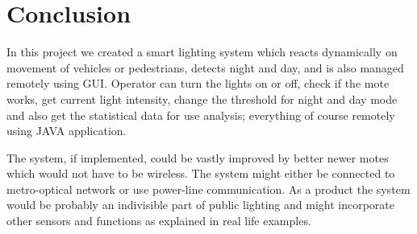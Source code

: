 \documentclass[UKenglish,10pt,a4paper]{report}
\let\openright=\clearpage
\begin{document}
\chapter{Conclusion}
In this project we created a smart lighting system which reacts dynamically on movement of vehicles or pedestrians, detects night and day, and is also managed remotely using GUI. Operator can turn the lights on or off, check if the mote works, get current light intensity, change the threshold for night and day mode and also get the statistical data for use analysis; everything of course remotely using JAVA application.

The system, if implemented, could be vastly improved by better newer motes which would not have to be wireless. The system might either be connected to metro-optical network or use power-line communication. As a product the system would be probably an indivisible part of public lighting and might incorporate other sensors and functions as explained in real life examples.

\renewcommand{\acronymname}{List of acronyms}
\printglossaries



% 
\printbibliography
\openright
\end{document}
